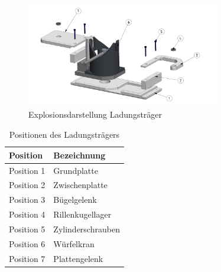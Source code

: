 \documentclass[../../main.tex]{subfiles}
\begin{document}
    \begin{figure}[H] %
        \centering
        \includegraphics[width=0.75\textwidth]{ladungstraeger.png}
        \caption{Explosionsdarstellung Ladungsträger}
        \label{fig:expl_ladungstraeger}
    \end{figure}
    \begin{table}[H] \centering
        \begin{tabular}{|l|l|}
        \hline
        \textbf{Position} & \textbf{Bezeichnung}\\
        \hline
        Position 1          & Grundplatte\\
         \hline
        Position 2          & Zwischenplatte\\
        \hline
        Position 3          & Bügelgelenk\\
        \hline
        Position 4          & Rillenkugellager\\
        \hline
        Position 5          & Zylinderschrauben\\
        \hline
        Position 6          & Würfelkran\\
        \hline
        Position 7          & Plattengelenk\\
        \hline
        \end{tabular}

        \caption{Positionen des Ladungsträgers}
        \label{tab:pos_ladungstraeger}
        \end{table}
\end{document}

